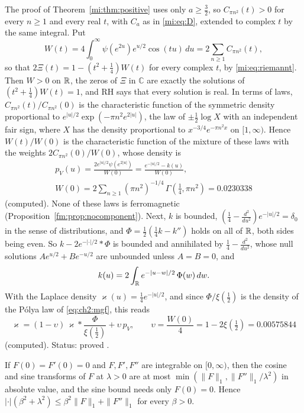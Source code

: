 \begin{remark}\label{mi:rem:laws}
\begin{resultpar}\label{mi:res:laws}The proof of Theorem~\ref{mi:thm:positive} uses only $a\ge\tfrac32$, so $C_{\pi n^2}(t)>0$ for every $n\ge1$ and every real $t$, with $C_a$ as in \eqref{mi:eq:D}, extended to complex $t$ by the same integral. Put
\[
W(t)=4\int_0^\infty\psi(e^{2u})e^{u/2}\cos(tu)\,du=2\sum_{n\ge1}C_{\pi n^2}(t),
\]
so that $2\Xi(t)=1-(t^2+\tfrac14)W(t)$ for every complex $t$, by \eqref{mi:eq:riemannt}. Then $W>0$ on $\mathbb{R}$, the zeros of $\Xi$ in $\mathbb C$ are exactly the solutions of $(t^2+\tfrac14)W(t)=1$, and RH says that every solution is real. In terms of laws, $C_{\pi n^2}(t)/C_{\pi n^2}(0)$ is the characteristic function of the symmetric density proportional to $e^{|u|/2}\exp(-\pi n^2e^{2|u|})$, the law of $\pm\tfrac12\log X$ with an independent fair sign, where $X$ has the density proportional to $x^{-3/4}e^{-\pi n^2x}$ on $[1,\infty)$. Hence $W(t)/W(0)$ is the characteristic function of the mixture of these laws with the weights $2C_{\pi n^2}(0)/W(0)$, whose density is
\begin{gather*}
p_V(u)=\frac{2e^{|u|/2}\psi(e^{2|u|})}{W(0)}=\frac{e^{-|u|/2}-k(u)}{W(0)},\\
W(0)=2\sum_{n\ge1}(\pi n^2)^{-1/4}\,\Gamma(\tfrac14,\pi n^2)=0.0230338
\end{gather*}
(computed). None of these laws is ferromagnetic (Proposition~\ref{fm:prop:nocomponent}). Next, $k$ is bounded, $(\tfrac14-\tfrac{d^2}{du^2})e^{-|u|/2}=\delta_0$ in the sense of distributions, and $\Phi=\tfrac12(\tfrac14k-k'')$ holds on all of $\mathbb{R}$, both sides being even. So $k-2e^{-|\cdot|/2}\ast\Phi$ is bounded and annihilated by $\tfrac14-\tfrac{d^2}{du^2}$, whose null solutions $Ae^{u/2}+Be^{-u/2}$ are unbounded unless $A=B=0$, and
\[
k(u)=2\int_{\mathbb{R}}e^{-|u-w|/2}\,\Phi(w)\,dw .
\]
With the Laplace density $\varkappa(u)=\tfrac14e^{-|u|/2}$, and since $\Phi/\xi(\tfrac12)$ is the density of the P\'olya law of \eqref{eq:ch2:mgf}, this reads
\[
\varkappa=(1-\upsilon)\,\varkappa\ast\frac{\Phi}{\xi(\frac12)}+\upsilon\,p_V,\qquad\upsilon=\frac{W(0)}4=1-2\xi(\tfrac12)=0.00575844
\]
(computed). Status: proved \cite{P26pole,P26excursion}.\end{resultpar}
\end{remark}

\begin{lemma}\label{mi:lem:twoside}
If $F(0)=F'(0)=0$ and $F,F',F''$ are integrable on $[0,\infty)$, then the cosine and sine transforms of $F$ at $\lambda>0$ are at most $\min(\|F\|_1,\|F''\|_1/\lambda^2)$ in absolute value, and the sine bound needs only $F(0)=0$. Hence $|\cdot|(\beta^2+\lambda^2)\le\beta^2\|F\|_1+\|F''\|_1$ for every $\beta>0$.
\end{lemma}

